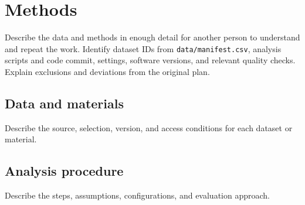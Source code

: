 \chapter{Methods}

Describe the data and methods in enough detail for another person to understand and repeat the work. Identify dataset IDs from \texttt{data/manifest.csv}, analysis scripts and code commit, settings, software versions, and relevant quality checks. Explain exclusions and deviations from the original plan.

\section{Data and materials}

Describe the source, selection, version, and access conditions for each dataset or material.

\section{Analysis procedure}

Describe the steps, assumptions, configurations, and evaluation approach.
